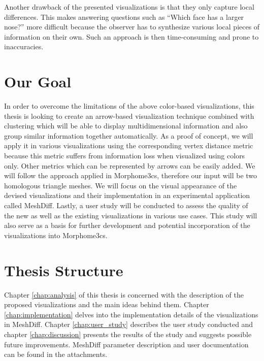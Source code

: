 
Another drawback of the presented visualizations is that they only capture local differences. This makes answering questions such as ``Which face has a larger nose?'' more difficult because the observer has to synthesize various local pieces of information on their own. Such an approach is then time-consuming and prone to inaccuracies.
\section*{Our Goal}

In order to overcome the limitations of the above color-based visualizations, this thesis is looking to create an arrow-based visualization technique combined with clustering which will be able to display multidimensional information and also group similar information together automatically. As a proof of concept, we will apply it in various visualizations using the corresponding vertex distance metric because this metric suffers from information loss when visualized using colors only. Other metrics which can be represented by arrows can be easily added. We will follow the approach applied in Morphome3cs, therefore our input will be two homologous triangle meshes. We will focus on the visual appearance of the devised visualizations and their implementation in an experimental application called MeshDiff. Lastly, a user study will be conducted to assess the quality of the new as well as the existing visualizations in various use cases. This study will also serve as a basis for further development and potential incorporation of the visualizations into Morphome3cs.
\section*{Thesis Structure}

Chapter \ref{chap:analysis} of this thesis is concerned with the description of the proposed visualizations and the main ideas behind them. Chapter \ref{chap:implementation} delves into the implementation details of the visualizations in MeshDiff. Chapter \ref{chap:user_study} describes the user study conducted and chapter \ref{chap:discussion} presents the results of the study and suggests possible future improvements. MeshDiff parameter description and user documentation can be found in the attachments.